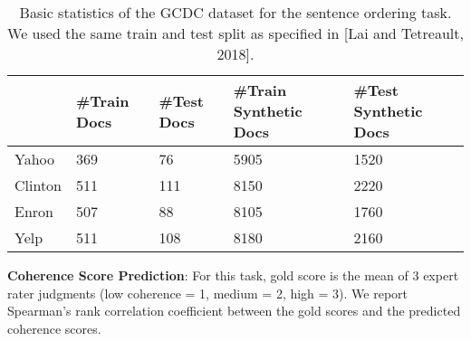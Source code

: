 \documentclass[11pt]{article}
\begin{document}
\begin{table}
    \centering
    \scriptsize
    \begin{tabular}{|l|l|l|p{0.7in}|p{0.6in}|}
\hline
&\#Train Docs&\#Test Docs&\#Train Synthetic Docs&\#Test Synthetic Docs\\
\hline
Yahoo&369&76&5905&1520\\
\hline
Clinton&511&111&8150&2220\\
\hline
Enron&507&88&8105&1760\\
\hline
Yelp&511&108&8180&2160\\
\hline
    \end{tabular}
    \caption{Basic statistics of the GCDC dataset for the sentence ordering task. We used the same train and test split as specified in [Lai and Tetreault, 2018].}
    \label{tab:gcdcStats2}
\end{table}

\noindent\textbf{Coherence Score Prediction}: For this task, gold score is the mean of 3 expert rater judgments (low coherence = 1, medium = 2, high = 3). We report Spearman's rank correlation coefficient between the gold scores and the predicted coherence scores.
\end{document}
